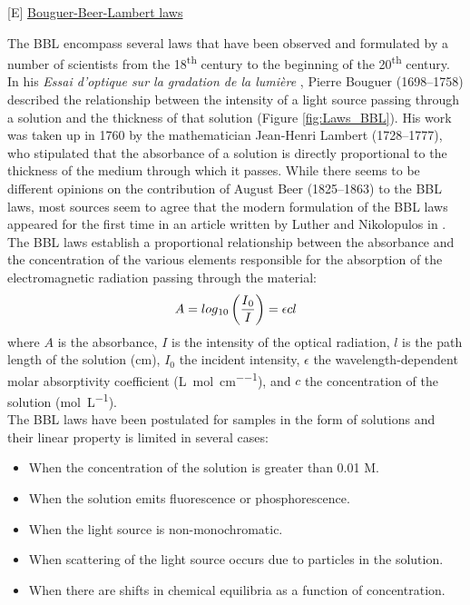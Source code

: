 [E] \underline{Bouguer-Beer-Lambert laws}

The \gls{BBL} encompass several laws that have been observed and formulated by a number of scientists from the 18\textsuperscript{th} century to the beginning of the 20\textsuperscript{th} century. In his \textit{Essai d’optique sur la gradation de la lumière} \citeyearpar{bouguer_essai_1729}, Pierre Bouguer (1698–1758) described the relationship between the intensity of a light source passing through a solution and the thickness of that solution (Figure \ref{fig:Laws_BBL}). His work was taken up in 1760 by the mathematician Jean-Henri Lambert (1728–1777), who stipulated that the absorbance of a solution is directly proportional to the thickness of the medium through which it passes. While there seems to be different opinions on the contribution of August Beer (1825–1863) to the \gls{BBL} laws, most sources seem to agree that the modern formulation of the \gls{BBL} laws appeared for the first time in an article written by Luther and Nikolopulos in \citeyear{luther_uber_1913}. \\

The \gls{BBL} laws establish a proportional relationship between the absorbance and the concentration of the various elements responsible for the absorption of the electromagnetic radiation passing through the material:
\begin{equation}
    A = log\textsubscript{10}\left(\frac{I\textsubscript{0}}{I}\right) = \epsilon c l
\end{equation}
where $A$ is the absorbance, $I$ is the intensity of the optical radiation, $l$ is the path length of the solution (\unit{\cm}), $I_0$ the incident intensity, $\epsilon$ the wavelength-dependent molar absorptivity coefficient (\unit{\liter\per\mole\per\cm}), and $c$ the concentration of the solution (\unit{\mole\per\liter}).\\

The \gls{BBL} laws have been postulated for samples in the form of solutions and their linear property is limited in several cases:
\begin{itemize}
    \item When the concentration of the solution is greater than 0.01 M.
    \item When the solution emits fluorescence or phosphorescence.
    \item When the light source is non-monochromatic. 
    \item When scattering of the light source occurs due to particles in the solution.
    \item When there are shifts in chemical equilibria as a function of concentration. 
\end{itemize}

